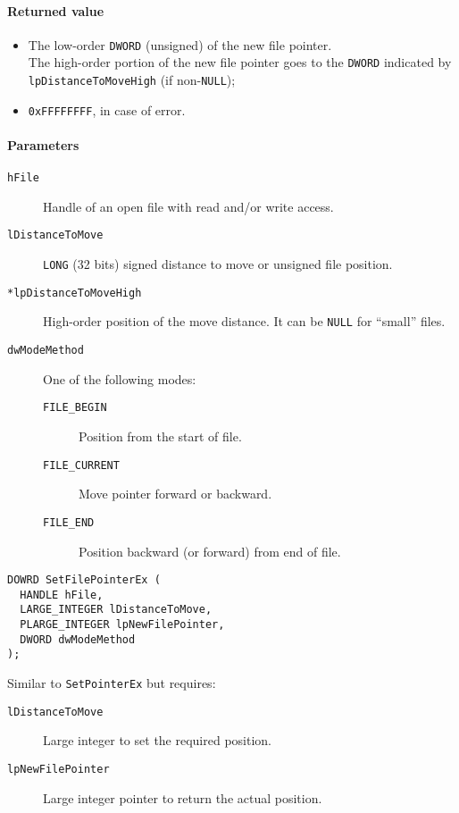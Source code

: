 \paragraph{Returned value}
\begin{itemize}
\item The low-order \texttt{DWORD} (unsigned) of the new file pointer. \\ The high-order portion of the new file pointer goes to the \texttt{DWORD} indicated by \texttt{lpDistanceToMoveHigh} (if non-\texttt{NULL});
\item \texttt{0xFFFFFFFF}, in case of error.
\end{itemize}

\paragraph{Parameters}
\begin{description}
\item [\texttt{hFile}] Handle of an open file with read and/or write access.
\item [\texttt{lDistanceToMove}] \texttt{LONG} (32 bits) signed distance to move or unsigned file position.
\item [\texttt{*lpDistanceToMoveHigh}] High-order position of the move distance. It can be \texttt{NULL} for ``small'' files.
\item [\texttt{dwModeMethod}] One of the following modes:
\begin{description}
\item [\texttt{FILE\_BEGIN}] Position from the start of file.
\item [\texttt{FILE\_CURRENT}] Move pointer forward or backward.
\item [\texttt{FILE\_END}] Position backward (or forward) from end of file.
\end{description}
\end{description}

\begin{verbatim}
DOWRD SetFilePointerEx (
  HANDLE hFile,
  LARGE_INTEGER lDistanceToMove,
  PLARGE_INTEGER lpNewFilePointer,
  DWORD dwModeMethod
);
\end{verbatim}

Similar to \texttt{SetPointerEx} but requires:
\begin{description}
\item [\texttt{lDistanceToMove}] Large integer to set the required position.
\item [\texttt{lpNewFilePointer}] Large integer pointer to return the actual position.
\end{description}

